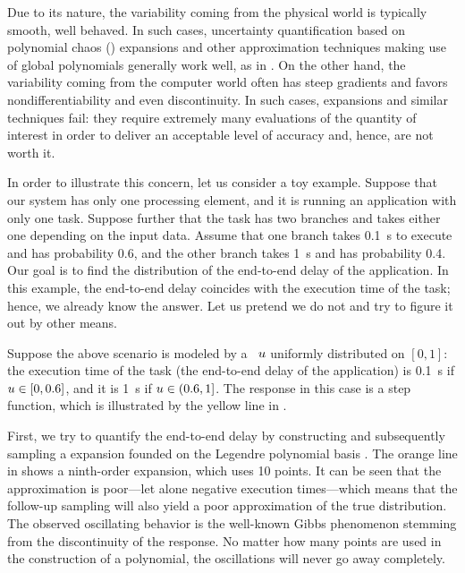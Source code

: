 
Due to its nature, the variability coming from the physical world is typically
smooth, well behaved. In such cases, uncertainty quantification based on
polynomial chaos () expansions \cite{xiu2010} and other approximation
techniques making use of global polynomials generally work well, as in
\cite{bhardwaj2008, lee2013, ukhov2014, ukhov2015}. On the other hand, the
variability coming from the computer world often has steep gradients and favors
nondifferentiability and even discontinuity. In such cases,  expansions
and similar techniques fail: they require extremely many evaluations of the
quantity of interest in order to deliver an acceptable level of accuracy and,
hence, are not worth it.

In order to illustrate this concern, let us consider a toy example. Suppose that
our system has only one processing element, and it is running an application
with only one task. Suppose further that the task has two branches and takes
either one depending on the input data. Assume that one branch takes 0.1~s to
execute and has probability 0.6, and the other branch takes 1~s and has
probability 0.4. Our goal is to find the distribution of the end-to-end delay of
the application. In this example, the end-to-end delay coincides with the
execution time of the task; hence, we already know the answer. Let us pretend we
do not and try to figure it out by other means.

Suppose the above scenario is modeled by a \rv\ $u$ uniformly distributed on
$[0, 1]$: the execution time of the task (the end-to-end delay of the
application) is 0.1~s if $u \in [0, 0.6]$, and it is 1~s if $u \in (0.6, 1]$.
The response in this case is a step function, which is illustrated by the yellow
line in .

First, we try to quantify the end-to-end delay by constructing and subsequently
sampling a  expansion founded on the Legendre polynomial basis
\cite{xiu2010}. The orange line in  shows a ninth-order 
expansion, which uses 10 points. It can be seen that the approximation is
poor---let alone negative execution times---which means that the follow-up
sampling will also yield a poor approximation of the true distribution. The
observed oscillating behavior is the well-known Gibbs phenomenon stemming from
the discontinuity of the response. No matter how many points are used in the
construction of a polynomial, the oscillations will never go away completely.


